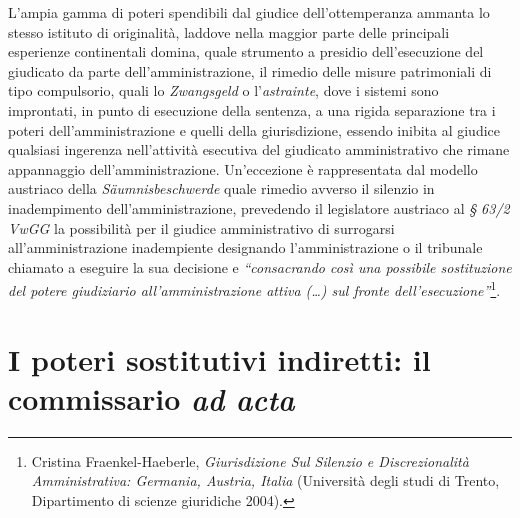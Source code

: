 \documentclass[12pt,it,a4paper,]{report}
\begin{document}
L'ampia gamma di poteri spendibili dal giudice dell'ottemperanza ammanta
lo stesso istituto di originalità, laddove nella maggior parte delle
principali esperienze continentali domina, quale strumento a presidio
dell'esecuzione del giudicato da parte dell'amministrazione, il rimedio
delle misure patrimoniali di tipo compulsorio, quali lo
\emph{Zwangsgeld} o l'\emph{astrainte}, dove i sistemi sono improntati,
in punto di esecuzione della sentenza, a una rigida separazione tra i
poteri dell'amministrazione e quelli della giurisdizione, essendo
inibita al giudice qualsiasi ingerenza nell'attività esecutiva del
giudicato amministrativo che rimane appannaggio dell'amministrazione.
Un'eccezione è rappresentata dal modello austriaco della
\emph{Säumnisbeschwerde} quale rimedio avverso il silenzio in
inadempimento dell'amministrazione, prevedendo il legislatore austriaco
al \emph{§ 63/2 VwGG} la possibilità per il giudice amministrativo di
surrogarsi all'amministrazione inadempiente designando l'amministrazione
o il tribunale chiamato a eseguire la sua decisione e
\emph{``consacrando così una possibile sostituzione del potere
giudiziario all'amministrazione attiva (\ldots) sul fronte
dell'esecuzione''}\footnote{{Cristina Fraenkel-Haeberle,
  \emph{Giurisdizione Sul Silenzio e Discrezionalità Amministrativa:
  {Germania}, {Austria}, {Italia}} ({Università degli studi di Trento,
  Dipartimento di scienze giuridiche} 2004).}}.

\hypertarget{i-poteri-sostitutivi-indiretti-il-commissario-ad-acta}{%
\section{\texorpdfstring{I poteri sostitutivi indiretti: il commissario
\emph{ad
acta}}{I poteri sostitutivi indiretti: il commissario ad acta}}\label{i-poteri-sostitutivi-indiretti-il-commissario-ad-acta}}
\end{document}
